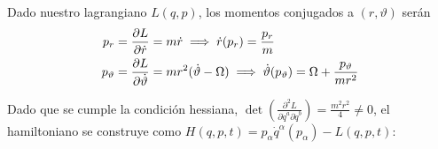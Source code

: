 \documentclass{article}
\begin{document}
Dado nuestro lagrangiano $L(q,p)$, los momentos conjugados a $(r,\vartheta)$ serán
\begin{align*}
    p_r &= \pdv{L}{\dot{r}} = m\dot{r} \implies \dot{r}(p_r) = \frac{p_r}{m}\\
    p_\vartheta &= \pdv{L}{\dot{\vartheta}} = mr^2(\dot{\vartheta} - \Omega ) \implies \dot{\vartheta}(p_\vartheta) = \Omega + \frac{p_\vartheta}{mr^2}
\end{align*}

Dado que se cumple la condición hessiana, $\det(\frac{\partial^2 L}{\partial\dot{q}^a\partial\dot{q}^b})=\frac{m^2r^2}{4}\neq0$, el hamiltoniano se construye como $H(q,p,t) = p_\alpha \dot{q}^\alpha (p_\alpha) - L(q,p,t)$:
\end{document}
